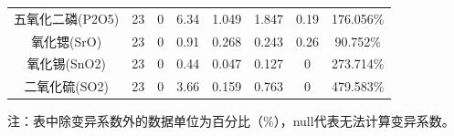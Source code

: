 \documentclass{my_paper}
\begin{document}
\begin{enumerate}
\begin{itemize}
\begin{longtable}{cccccccc}
            五氧化二磷(P2O5)          & 23                   & 0                    & 6.34                 & 1.049                & 1.847                & 0.19                 & 176.056\%            \\
            氧化锶(SrO)             & 23                   & 0                    & 0.91                 & 0.268                & 0.243                & 0.26                 & 90.752\%             \\
            氧化锡(SnO2)            & 23                   & 0                    & 0.44                 & 0.047                & 0.127                & 0                    & 273.714\%            \\
            二氧化硫(SO2)            & 23                   & 0                    & 3.66                 & 0.159                & 0.763                & 0                    & 479.583\%            \\ \bottomrule
        \end{longtable}  
        \begin{center}
          注：表中除变异系数外的数据单位为百分比（$\%$），null代表无法计算变异系数。
        \end{center}


\end{itemize}
\end{enumerate}
\end{document}
